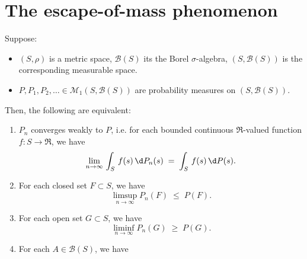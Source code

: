 

\section{The escape-of-mass phenomenon}
\setcounter{theorem}{0}
\setcounter{equation}{0}

\renewcommand{\theenumi}{\roman{enumi}}
\renewcommand{\labelenumi}{\textnormal{(\theenumi)}$\;\;$}

\begin{example}

\end{example}

\begin{theorem}
\label{PortmanteauTheorem}
\mbox{}\vskip 0.2cm
\noindent
Suppose:
\begin{itemize}
\item	$\left(S,\rho\right)$ is a metric space, $\mathcal{B}(S)$ its the Borel $\sigma$-algebra,
		$\left(S,\mathcal{B}(S)\right)$ is the corresponding measurable space.
\item	$P, P_{1}, P_{2}, \ldots \in \mathcal{M}_{1}\!\left(S,\mathcal{B}(S)\right)$
		are probability measures on $\left(S,\mathcal{B}(S)\right)$.
\end{itemize}
Then, the following are equivalent:
\begin{enumerate}
\item	$P_{n}$ converges weakly to $P$,
		i.e. for each bounded continuous $\Re$-valued function $f : S \longrightarrow \Re$, we have
		\begin{equation*}
		\lim_{n\rightarrow\infty}\,\int_{S}\,f(s)\,\d P_{n}(s) \;=\; \int_{S}\,f(s)\,\d P(s).
		\end{equation*}
\item	For each closed set $F \subset S$, we have
		\begin{equation*}
		\limsup_{n\rightarrow\infty}P_{n}(F) \;\leq\; P(F).
		\end{equation*}
\item	For each open set $G \subset S$, we have
		\begin{equation*}
		\liminf_{n\rightarrow\infty}P_{n}(G) \;\geq\; P(G).
		\end{equation*}
\item	For each $A \in \mathcal{B}(S)$, we have
		\begin{equation*}

\end{equation*}
\end{enumerate}
\end{theorem}
